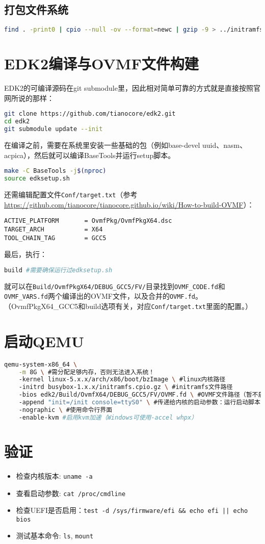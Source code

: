 \subsection{打包文件系统}
\begin{lstlisting}[language=bash]
find . -print0 | cpio --null -ov --format=newc | gzip -9 > ../initramfs.cpio.gz
\end{lstlisting}

\section{EDK2编译与OVMF文件构建}
EDK2的可编译源码在git submodule里，因此相对简单可靠的方式就是直接按照官网所说的那样：
\begin{lstlisting}[language=bash]
git clone https://github.com/tianocore/edk2.git
cd edk2
git submodule update --init
\end{lstlisting}
在编译之前，需要在系统里安装一些基础的包（例如base-devel uuid、nasm、acpica），然后就可以编译BaseTools并运行setup脚本。
\begin{lstlisting}[language=bash]
make -C BaseTools -j$(nproc)
source edksetup.sh
\end{lstlisting}
还需编辑配置文件\texttt{Conf/target.txt}（参考\url{https://github.com/tianocore/tianocore.github.io/wiki/How-to-build-OVMF}）：
\begin{lstlisting}
ACTIVE_PLATFORM       = OvmfPkg/OvmfPkgX64.dsc
TARGET_ARCH           = X64
TOOL_CHAIN_TAG        = GCC5
\end{lstlisting}
最后，执行：
\begin{lstlisting}[language=bash]
build #需要确保运行过edksetup.sh
\end{lstlisting}
就可以在\texttt{Build/OvmfPkgX64/DEBUG\_GCC5/FV/}目录找到\texttt{OVMF\_CODE.fd}和\texttt{OVMF\_VARS.fd}两个编译出的OVMF文件，以及合并的\texttt{OVMF.fd}。（OvmfPkgX64\_GCC5和build选项有关，对应\texttt{Conf/target.txt}里面的配置。）

\section{启动QEMU}
\begin{lstlisting}[language=bash]
qemu-system-x86_64 \
    -m 8G \ #需分配足够内存，否则无法进入系统！
    -kernel linux-5.x.x/arch/x86/boot/bzImage \ #linux内核路径
    -initrd busybox-1.x.x/initramfs.cpio.gz \ #initramfs文件路径
    -bios edk2/Build/OvmfX64/DEBUG_GCC5/FV/OVMF.fd \ #OVMF文件路径（暂不启用UEFI可以去掉，使用默认SeaBIOS）
    -append "init=/init console=ttyS0" \ #传递给内核的启动参数：运行启动脚本，配置控制台输出
    -nographic \ #使用命令行界面
    -enable-kvm #启用kvm加速（Windows可使用-accel whpx）
\end{lstlisting}

\section{验证}
\begin{itemize}
    \item 检查内核版本: \texttt{uname -a}
    \item 查看启动参数: \texttt{cat /proc/cmdline}
    \item 检查UEFI是否启用：\texttt{test -d /sys/firmware/efi \&\& echo efi || echo bios}
    \item 测试基本命令: \texttt{ls}, \texttt{mount}
\end{itemize}
